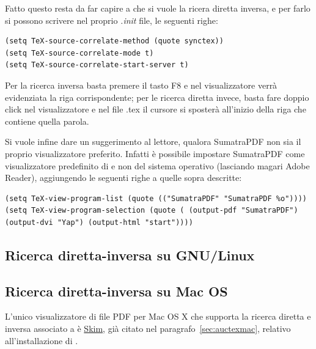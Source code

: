 \documentclass[11pt,a4paper]{article}
\begin{document}
Fatto questo resta da far capire a \emacs{} che si vuole la ricera
diretta inversa, e per farlo si possono scrivere nel proprio
\emph{.init} file, le seguenti righe:
\begin{Verbatim}
(setq TeX-source-correlate-method (quote synctex))
(setq TeX-source-correlate-mode t)
(setq TeX-source-correlate-start-server t)
\end{Verbatim}

Per la ricerca inversa basta premere il tasto \textsf{F8} e nel visualizzatore
verrà evidenziata la riga corrispondente; per le ricerca diretta invece, basta
fare doppio click nel visualizzatore e nel file .tex il cursore si sposterà
all'inizio della riga che contiene quella parola.

Si vuole infine dare un suggerimento al lettore, qualora
\textsf{SumatraPDF} non sia il proprio visualizzatore
preferito. Infatti è possibile impostare \textsf{SumatraPDF} come
visualizzatore predefinito di \emacs{} e non del sistema operativo
(lasciando magari \textsf{Adobe Reader}), aggiungendo le seguenti
righe a quelle sopra descritte:
\begin{Verbatim}
(setq TeX-view-program-list (quote (("SumatraPDF" "SumatraPDF %o"))))
(setq TeX-view-program-selection (quote ( (output-pdf "SumatraPDF")
(output-dvi "Yap") (output-html "start"))))
\end{Verbatim}

\subsection{Ricerca diretta-inversa su GNU/Linux}
\label{sec:fislinux}

\textcolor{red}{\lipsum[1]}

\subsection{Ricerca diretta-inversa su Mac OS}
\label{sec:fismac}

L'unico visualizzatore di file PDF per Mac OS X che supporta la
ricerca diretta e inversa associato a \emacs{} è
\href{http://skim-app.sourceforge.net/}{Skim}, già citato nel
paragrafo~\ref{sec:auctexmac}, relativo all'installazione di
\auctex{}.
\end{document}
